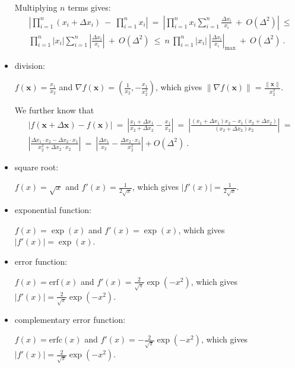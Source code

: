 \documentclass{article}
\newcommand\Bx{\bm{x}}
\renewcommand{\leq}{\leqslant}
\begin{document}
\begin{itemize}
Multiplying $n$ terms gives:
\begin{align}
&\left| \prod_{i=1}^n (x_i + \Delta x_i)  \ - \ \prod_{i=1}^n x_i \right| 
\ = \ \left| \prod_{i=1}^n x_i \sum_{i=1}^n \frac{\Delta x_i}{x_i} \ +
  \ O(  \Delta^2)  \right|  \ \leq  \\ \nonumber &\prod_{i=1}^n  \left| x_i \right|
  \sum_{i=1}^n \left| \frac{\Delta x_i}{x_i} \right| \ +
  \ O(  \Delta^2) \ \leq \
  n \ \prod_{i=1}^n  \left| x_i \right| \   \left|\frac{\Delta
  x_i}{x_i}  \right|_{\mathrm{max}} \ +
  \ O(  \Delta^2)\ .
\end{align}


\item division:

$f(\Bx)=\frac{x_1}{x_2}$ and $\nabla
f(\Bx)= \left(\frac{1}{x_2},-\frac{x_1}{x_2^2} \right)$, which gives
$\left\| \nabla f(\Bx)\right\|= \frac{\left\| \Bx \right\|}{x_2^2}$.

We further know that
\begin{align}
&\left|f(\Bx +\Delta \Bx) -f(\Bx)\right| \ 
= \ \left| \frac{x_1 +\Delta x_1}{x_2+ \Delta x_2} - \frac{x_1}{x_2} \right|
  \ = \
 \left| \frac{(x_1 +\Delta x_1)x_2-x_1(x_2+ \Delta x_2)}{(x_2+ \Delta
  x_2)x_2} \right| \ = \\\nonumber
&\left| \frac{\Delta x_1 \cdot x_2-\Delta x_2 \cdot x_1}{x_2^2+ \Delta
  x_2 \cdot x_2} \right| \ = \ \left|  \frac{\Delta x_1}{x_2} - \frac{\Delta
  x_2 \cdot x_1}{x_2^2} \right| + O(\Delta^2) \ .
\end{align}

\item square root:

$f(x)= \sqrt{x}$ and $f'(x)= \frac{1}{2 \sqrt{x}}$, which gives
$\left| f'(x)\right|= \frac{1}{2 \sqrt{x}}$.

\item exponential function:

$f(x)= \exp(x)$ and $f'(x)= \exp(x)$, which gives
$\left| f'(x)\right|= \exp(x)$.

\item error function:

$f(x)= \mathrm{erf}(x)$ and $f'(x)= \frac {2}{\sqrt {\pi }} \exp(-x^2)$, which gives
$\left| f'(x)\right|= \frac {2}{\sqrt {\pi }} \exp(-x^2)$.

\item complementary error function:

$f(x)= \mathrm{erfc}(x)$ and $f'(x)= - \frac {2}{\sqrt {\pi }} \exp(-x^2)$, which gives
$\left| f'(x)\right|= \frac {2}{\sqrt {\pi }} \exp(-x^2)$.
\end{itemize}
\end{document}
